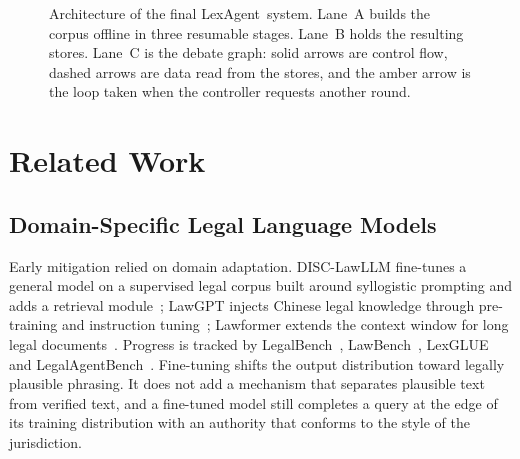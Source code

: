 \documentclass[conference]{IEEEtran}
\newcommand{\sys}{LexAgent}
\begin{document}
\begin{figure}[t]
\centering

\caption{Architecture of the final \sys\ system. Lane~A builds the corpus offline in three resumable stages. Lane~B holds the resulting stores. Lane~C is the debate graph: solid arrows are control flow, dashed arrows are data read from the stores, and the amber arrow is the loop taken when the controller requests another round.}\label{fig:arch}
\end{figure}

\section{Related Work}\label{sec:related}

\subsection{Domain-Specific Legal Language Models}
Early mitigation relied on domain adaptation. DISC-LawLLM fine-tunes a general model on a supervised legal corpus built around syllogistic prompting and adds a retrieval module~\cite{disclawllm}; LawGPT injects Chinese legal knowledge through pre-training and instruction tuning~\cite{lawgpt}; Lawformer extends the context window for long legal documents~\cite{lawformer}. Progress is tracked by LegalBench~\cite{legalbench}, LawBench~\cite{lawbench}, LexGLUE~\cite{lexglue} and LegalAgentBench~\cite{legalagentbench}. Fine-tuning shifts the output distribution toward legally plausible phrasing. It does not add a mechanism that separates plausible text from verified text, and a fine-tuned model still completes a query at the edge of its training distribution with an authority that conforms to the style of the jurisdiction.
\end{document}
